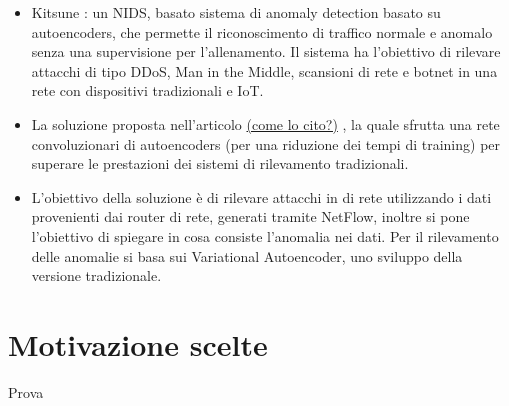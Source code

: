 \begin{itemize}
\item Kitsune \cite{kitsune}: un NIDS, basato sistema di anomaly detection basato su autoencoders, che permette il riconoscimento di traffico normale e anomalo senza una supervisione per l'allenamento. Il sistema ha l'obiettivo di rilevare attacchi di tipo DDoS, Man in the Middle, scansioni di rete e botnet in una rete con dispositivi tradizionali e IoT.
\item La soluzione proposta nell'articolo  \uline{(come lo cito?)} \cite{chen_autoencoders}, la quale sfrutta una rete convoluzionari di autoencoders (per una riduzione dei tempi di training) per superare le prestazioni dei sistemi di rilevamento tradizionali.
\item L'obiettivo della soluzione \cite{vae_autoencoders} è di rilevare attacchi in di rete utilizzando i dati provenienti dai router di rete, generati tramite NetFlow, inoltre si pone l'obiettivo di spiegare in cosa consiste l'anomalia nei dati. Per il rilevamento delle anomalie si basa sui Variational Autoencoder, uno sviluppo della versione tradizionale.

\end{itemize}

\section{Motivazione scelte}
Prova 



